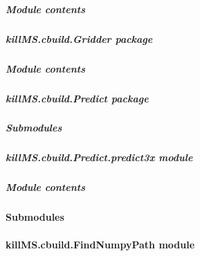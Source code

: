 \documentclass[letterpaper,10pt,english]{sphinxmanual}
\begin{document}
\subparagraph{Module contents}
\label{\detokenize{api/killMS.cbuild.Array:module-killMS.cbuild.Array}}\label{\detokenize{api/killMS.cbuild.Array:module-contents}}
\sphinxstepscope


\subparagraph{killMS.cbuild.Gridder package}
\label{\detokenize{api/killMS.cbuild.Gridder:killms-cbuild-gridder-package}}\label{\detokenize{api/killMS.cbuild.Gridder::doc}}

\subparagraph{Module contents}
\label{\detokenize{api/killMS.cbuild.Gridder:module-killMS.cbuild.Gridder}}\label{\detokenize{api/killMS.cbuild.Gridder:module-contents}}
\sphinxstepscope


\subparagraph{killMS.cbuild.Predict package}
\label{\detokenize{api/killMS.cbuild.Predict:killms-cbuild-predict-package}}\label{\detokenize{api/killMS.cbuild.Predict::doc}}

\subparagraph{Submodules}
\label{\detokenize{api/killMS.cbuild.Predict:submodules}}

\subparagraph{killMS.cbuild.Predict.predict3x module}
\label{\detokenize{api/killMS.cbuild.Predict:killms-cbuild-predict-predict3x-module}}

\subparagraph{Module contents}
\label{\detokenize{api/killMS.cbuild.Predict:module-killMS.cbuild.Predict}}\label{\detokenize{api/killMS.cbuild.Predict:module-contents}}

\paragraph{Submodules}
\label{\detokenize{api/killMS.cbuild:submodules}}

\paragraph{killMS.cbuild.FindNumpyPath module}
\label{\detokenize{api/killMS.cbuild:module-killMS.cbuild.FindNumpyPath}}\label{\detokenize{api/killMS.cbuild:killms-cbuild-findnumpypath-module}}
\end{document}

